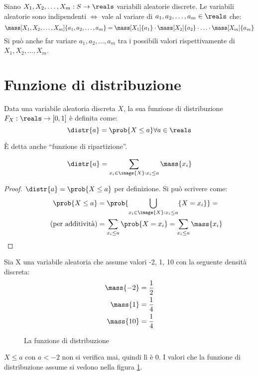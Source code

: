 \begin{prop}
Siano $X_1, X_2, \ldots, X_m : S \to \reals$ variabili aleatorie discrete. Le variabili aleatorie sono indipendenti $\iff$ vale al variare di $a_1, a_2, \ldots, a_m \in \reals$ che:
\[
\mass[X_1, X_2, \ldots, X_m]{a_1, a_2, \ldots, a_m} = \mass[X_1]{a_1} \cdot \mass[X_2]{a_2} \cdot \ldots \cdot \mass[X_m]{a_m}
\]
Si pu\`o anche far variare $a_1, a_2, \ldots, a_m$ tra i possibili valori rispettivamente di $X_1, X_2, \ldots, X_m$.
\end{prop}

\section{Funzione di distribuzione}

\begin{defn}
Data una variabile aleatoria discreta $X$, la sua funzione di distribuzione $F_X : \reals \to [0,1]$ \`e definita come:
\[
\distr{a} = \prob{X \le a} \forall a \in \reals
\]
\end{defn}
\`E detta anche ``funzione di ripartizione''.
\begin{fact}
\[
\distr{a} = \sum_{x_i \in \image{X} : x_i \le a} \mass{x_i}
\]
\end{fact}
\begin{proof}
$\distr{a} = \prob{X \le a}$ per definizione. Si pu\`o scrivere come:
\begin{align*}
\prob{X \le a} &= \prob{\bigcup_{x_i \in \image{X} : x_i \le a} \{ X = x_i \}} = \\ \tag{per additivit\`a}
&= \sum_{x_i \le a} \prob{X = x_i} = \sum_{x_i \le a} \mass{x_i}
\end{align*}
\end{proof}
\begin{exmp}
Sia X una variabile aleatoria che assume valori -2, 1, 10 con la seguente densit\`a discreta:
\begin{align*}
\mass{-2} &= \frac{1}{2} \\
\mass{1} &= \frac{1}{4} \\
\mass{10} &= \frac{1}{4}
\end{align*}
\begin{figure}[ht]
\centering
{}
\caption{\label{fig:distribuzione}La funzione di distribuzione}
\end{figure}
$X \le a$ con $a < -2$ non si verifica mai, quindi l\`i \`e 0. I valori che la funzione di distribuzione assume si vedono nella figura \ref{fig:distribuzione}.
\end{exmp}
